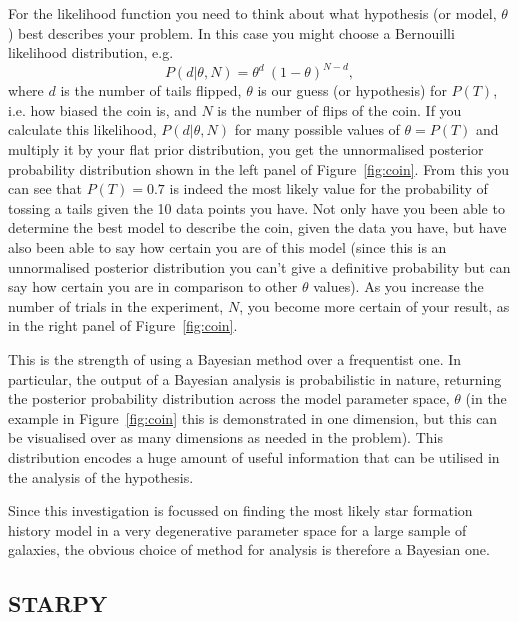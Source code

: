 For the likelihood function you need to think about what hypothesis (or model, $\theta$) best describes your problem. In this case you might choose a Bernouilli likelihood distribution, e.g. 
\begin{equation}\label{bernouilli}
P(d  | \theta, N) = \theta^d~ (1-\theta)^{N-d}, 
\end{equation}
where $d$ is the number of tails flipped, $\theta$ is our guess (or hypothesis) for $P(T)$, i.e. how biased the coin is, and $N$ is the number of flips of the coin. If you calculate this likelihood, $P(d | \theta, N)$ for many possible values of $\theta = P(T)$ and multiply it by your flat prior distribution, you get the unnormalised posterior probability distribution shown in the left panel of Figure~\ref{fig:coin}. From this you can see that $P(T) = 0.7$ is indeed the most likely value for the probability of tossing a tails given the 10 data points you have. Not only have you been able to determine the best model to describe the coin, given the data you have, but have also been able to say how certain you are of this model (since this is an unnormalised posterior distribution you can't give a definitive probability but can say how certain you are in comparison to other $\theta$ values). As you increase the number of trials in the experiment, $N$, you become more certain of your result, as in the right panel of Figure~\ref{fig:coin}. 

This is the strength of using a Bayesian method over a frequentist one. In particular, the output of a Bayesian analysis is probabilistic in nature, returning the posterior probability distribution across the model parameter space, $\theta$ (in the example in Figure~\ref{fig:coin} this is demonstrated in one dimension, but this can be visualised over as many dimensions as needed in the problem). This distribution encodes a huge amount of useful information that can be utilised in the analysis of the hypothesis. 

Since this investigation is focussed on finding the most likely star formation history model in a very degenerative parameter space for a large sample of galaxies, the obvious choice of method for analysis is therefore a Bayesian one.  


\subsection{STARPY}


